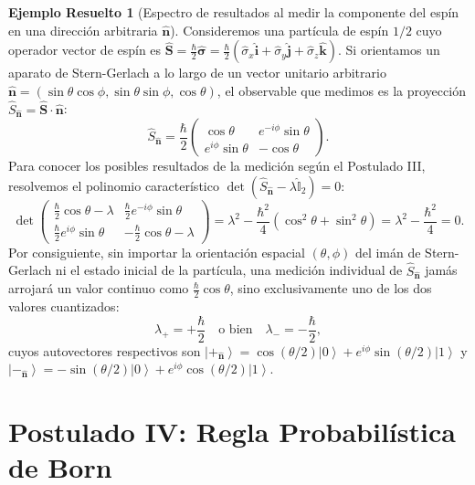 \documentclass[11pt,a4paper,twoside]{report}
\theoremstyle{definition}
\newtheorem{ejemplo}{Ejemplo Resuelto}[chapter]
\theoremstyle{plain}
\theoremstyle{remark}
\newcommand{\ket}[1]{\left| #1 \right\rangle}
\newcommand{\op}[1]{\hat{#1}}
\newcommand{\ident}{\hat{\mathbb{I}}}
\begin{document}
\begin{ejemplo}[Espectro de resultados al medir la componente del espín en una dirección arbitraria $\bm{\hat{n}}$]
Consideremos una partícula de espín $1/2$ cuyo operador vector de espín es $\bm{\op{S}} = \frac{\hbar}{2}\bm{\op{\sigma}} = \frac{\hbar}{2}(\op{\sigma}_x \bm{\hat{i}} + \op{\sigma}_y \bm{\hat{j}} + \op{\sigma}_z \bm{\hat{k}})$. Si orientamos un aparato de Stern-Gerlach a lo largo de un vector unitario arbitrario $\bm{\hat{n}} = (\sin\theta\cos\phi, \sin\theta\sin\phi, \cos\theta)$, el observable que medimos es la proyección $\op{S}_{\bm{\hat{n}}} = \bm{\op{S}}\cdot \bm{\hat{n}}$:
\begin{equation}
    \op{S}_{\bm{\hat{n}}} = \frac{\hbar}{2}\begin{pmatrix} \cos\theta & e^{-i\phi}\sin\theta \\ e^{i\phi}\sin\theta & -\cos\theta \end{pmatrix}.
\end{equation}
Para conocer los posibles resultados de la medición según el Postulado III, resolvemos el polinomio característico $\det(\op{S}_{\bm{\hat{n}}} - \lambda \ident_2) = 0$:
\begin{equation}
    \det\begin{pmatrix} \frac{\hbar}{2}\cos\theta - \lambda & \frac{\hbar}{2}e^{-i\phi}\sin\theta \\ \frac{\hbar}{2}e^{i\phi}\sin\theta & -\frac{\hbar}{2}\cos\theta - \lambda \end{pmatrix} = \lambda^2 - \frac{\hbar^2}{4}(\cos^2\theta + \sin^2\theta) = \lambda^2 - \frac{\hbar^2}{4} = 0.
\end{equation}
Por consiguiente, sin importar la orientación espacial $(\theta, \phi)$ del imán de Stern-Gerlach ni el estado inicial de la partícula, una medición individual de $\op{S}_{\bm{\hat{n}}}$ jamás arrojará un valor continuo como $\frac{\hbar}{2}\cos\theta$, sino exclusivamente uno de los dos valores cuantizados:
\begin{equation}
    \lambda_+ = +\frac{\hbar}{2} \quad \text{o bien} \quad \lambda_- = -\frac{\hbar}{2},
\end{equation}
cuyos autovectores respectivos son $\ket{+_{\bm{\hat{n}}}} = \cos(\theta/2)\ket{0} + e^{i\phi}\sin(\theta/2)\ket{1}$ y $\ket{-_{\bm{\hat{n}}}} = -\sin(\theta/2)\ket{0} + e^{i\phi}\cos(\theta/2)\ket{1}$.
\end{ejemplo}

\section{Postulado IV: Regla Probabilística de Born}
\end{document}
